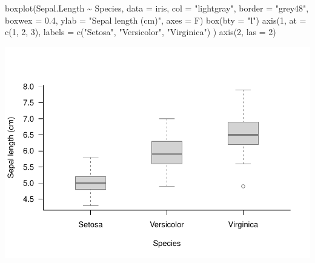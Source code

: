 \documentclass[
]{book}
\newenvironment{Shaded}{\begin{snugshade}}{\end{snugshade}}
\newcommand{\AttributeTok}[1]{\textcolor[rgb]{0.77,0.63,0.00}{#1}}
\newcommand{\DecValTok}[1]{\textcolor[rgb]{0.00,0.00,0.81}{#1}}
\newcommand{\FloatTok}[1]{\textcolor[rgb]{0.00,0.00,0.81}{#1}}
\newcommand{\FunctionTok}[1]{\textcolor[rgb]{0.00,0.00,0.00}{#1}}
\newcommand{\NormalTok}[1]{#1}
\newcommand{\SpecialCharTok}[1]{\textcolor[rgb]{0.00,0.00,0.00}{#1}}
\newcommand{\StringTok}[1]{\textcolor[rgb]{0.31,0.60,0.02}{#1}}
\begin{document}
\begin{Shaded}
\begin{Highlighting}[]
\FunctionTok{boxplot}\NormalTok{(Sepal.Length }\SpecialCharTok{\textasciitilde{}}\NormalTok{ Species, }\AttributeTok{data =}\NormalTok{ iris,}
        \AttributeTok{col =} \StringTok{"lightgray"}\NormalTok{, }\AttributeTok{border =} \StringTok{"grey48"}\NormalTok{,}
        \AttributeTok{boxwex =} \FloatTok{0.4}\NormalTok{, }\AttributeTok{ylab =} \StringTok{"Sepal length (cm)"}\NormalTok{,}
        \AttributeTok{axes =}\NormalTok{ F)}
\FunctionTok{box}\NormalTok{(}\AttributeTok{bty =} \StringTok{"l"}\NormalTok{)}
\FunctionTok{axis}\NormalTok{(}\DecValTok{1}\NormalTok{, }\AttributeTok{at =} \FunctionTok{c}\NormalTok{(}\DecValTok{1}\NormalTok{, }\DecValTok{2}\NormalTok{, }\DecValTok{3}\NormalTok{), }\AttributeTok{labels =} \FunctionTok{c}\NormalTok{(}\StringTok{"Setosa"}\NormalTok{, }\StringTok{"Versicolor"}\NormalTok{, }\StringTok{"Virginica"}\NormalTok{) )}
\FunctionTok{axis}\NormalTok{(}\DecValTok{2}\NormalTok{, }\AttributeTok{las =} \DecValTok{2}\NormalTok{)}
\end{Highlighting}
\end{Shaded}

\begin{center}\includegraphics{_main_files/figure-latex/unnamed-chunk-127-1} \end{center}
\end{document}
